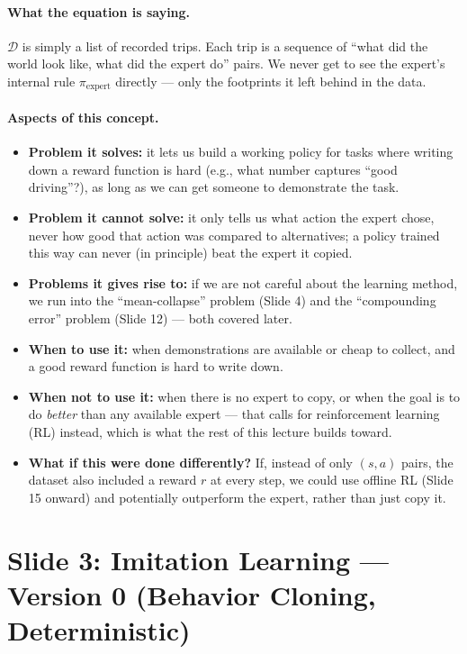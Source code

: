 \documentclass[11pt]{article}
\begin{document}
\paragraph{What the equation is saying.}
$\mathcal{D}$ is simply a list of recorded trips. Each trip is a sequence of
``what did the world look like, what did the expert do'' pairs. We never get to see the
expert's internal rule $\pi_{\text{expert}}$ directly --- only the footprints it left
behind in the data.

\paragraph{Aspects of this concept.}
\begin{itemize}
\item \textbf{Problem it solves:} it lets us build a working policy for tasks where
writing down a reward function is hard (e.g., what number captures ``good driving''?),
as long as we can get someone to demonstrate the task.
\item \textbf{Problem it cannot solve:} it only tells us what action the expert chose,
never how good that action was compared to alternatives; a policy trained this way can
never (in principle) beat the expert it copied.
\item \textbf{Problems it gives rise to:} if we are not careful about the learning
method, we run into the ``mean-collapse'' problem (Slide 4) and the ``compounding
error'' problem (Slide 12) --- both covered later.
\item \textbf{When to use it:} when demonstrations are available or cheap to collect,
and a good reward function is hard to write down.
\item \textbf{When not to use it:} when there is no expert to copy, or when the goal is
to do \emph{better} than any available expert --- that calls for reinforcement learning
(RL) instead, which is what the rest of this lecture builds toward.
\item \textbf{What if this were done differently?} If, instead of only $(s,a)$ pairs, the
dataset also included a reward $r$ at every step, we could use offline RL (Slide 15
onward) and potentially outperform the expert, rather than just copy it.
\end{itemize}

\section{Slide 3: Imitation Learning --- Version 0 (Behavior Cloning, Deterministic)}
\end{document}
